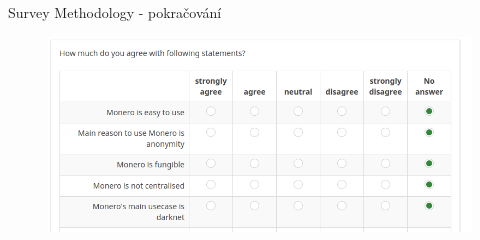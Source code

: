 \documentclass{beamer}
\begin{document}
\begin{darkframes}
\begin{frame}{Survey Methodology - pokračování}
\begin{figure}
  \centering
  \includegraphics[width=1\textwidth]{survey-answernextanother.png}
\end{figure}
    \end{frame}

    



  \end{darkframes}
\end{document}
